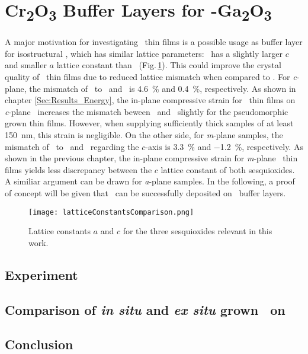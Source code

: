 \section{\texorpdfstring{C\lowercase{r}\textsubscript{2}O\textsubscript{3}}{Cr2O3} Buffer Layers for \texorpdfstring{\textalpha-G\lowercase{a}\textsubscript{2}O\textsubscript{3}}{a-Ga2O3}}
    \label{Sec:Results_Buffer}

A major motivation for investigating \cro\ thin films is a possible usage as buffer layer for isostructural \agao, which has similar lattice parameters:
\cro\ has a slightly larger $c$ and smaller $a$ lattice constant than \agao\ (Fig.\,\ref{Fig:Results_4_LatticeConstantsComp}).
This could improve the crystal quality of \agao\ thin films due to reduced lattice mismatch when compared to 
    \cite{stepanov2021}.
For \textit{c}-plane, the mismatch of \agao\ to \alo\ and \cro\ is \qty{4.6}{\percent} and \qty{0.4}{\percent}, respectively.
As shown in chapter \ref{Sec:Results_Energy}, the in-plane compressive strain for \cro\ thin films on \textit{c}-plane \alo\ increases the mismatch beween \cro\ and \agao\ slightly for the pseudomorphic grown thin films.
However, when supplying sufficiently thick samples of at least \qty{150}{\nm}, this strain is negligible.
On the other side, for \textit{m}-plane samples, the mismatch of \agao\ to \alo\ and \cro\ regarding the $c$-axis is \qty{3.3}{\percent} and \qty{-1.2}{\percent}, respectively.
As shown in the previous chapter, the in-plane compressive strain for \textit{m}-plane \cro\ thin films yields less discrepancy between the $c$ lattice constant of both sesquioxides.
A similiar argument can be drawn for \textit{a}-plane samples.
In the following, a proof of concept will be given that \agao\ can be successfully deposited on \cro\ buffer layers.
\begin{figure}[b]
    \centering
    \texttt{[image: latticeConstantsComparison.png]}
    \caption{Lattice constants $a$ and $c$ for the three sesquioxides relevant in this work.}
    \label{Fig:Results_4_LatticeConstantsComp}
\end{figure}

\subsection{Experiment}
    
\subsection{Comparison of \textit{in situ} and \textit{ex situ} grown \texorpdfstring{\gao}{Ga2O3}\ on \texorpdfstring{\cro}{Cr2O3}}
    
    \clearpage
\subsection{Conclusion}
    